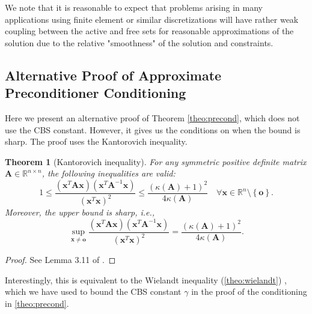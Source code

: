 \documentclass[11pt]{article}
\theoremstyle{plain}
\newtheorem{theorem}{Theorem}[section]
\theoremstyle{definition}
\newcommand{\Vo}{\bm{o}}
\newcommand{\Vx}{\bm{x}}
\newcommand{\MA}{\bm{A}}
\begin{document}
We note that it is reasonable to expect that problems arising in many applications using finite element or similar discretizations will have rather weak coupling between the active and free sets for reasonable approximations of the solution due to the relative "smoothness" of the solution and constraints.

\subsection{Alternative Proof of Approximate Preconditioner Conditioning}
Here we present an alternative proof of Theorem \ref{theo:precond}, which does not use the CBS constant. However, it gives us the conditions on when the bound is sharp. The proof uses the Kantorovich inequality.

\begin{theorem}[Kantorovich inequality]
  \label{theo:kant}
  For any symmetric positive definite matrix $\MA \in \mathbb{R}^{n \times n}$, the following inequalities are valid:
\begin{equation*}
  1 \leq \frac{\left(\Vx^{T} \MA \Vx \right) \left(\Vx^{T} \MA^{-1} \Vx\right)}{\left(\Vx^{T} \Vx\right)^{2}} \leq \frac{\left( \kappa\left( \MA \right) +1  \right)^{2}}{4\kappa(\MA)} \quad \forall \Vx \in \mathbb{R}^{n}\setminus \left\{\Vo \right\}.
\end{equation*}
Moreover, the upper bound is sharp, i.e.,
\begin{equation*}
  \sup_{\Vx \neq \Vo} \frac{\left(\Vx^{T} \MA \Vx \right) \left(\Vx^{T} \MA^{-1} \Vx\right)}{\left(\Vx^{T} \Vx\right)^{2}} = \frac{\left( \kappa\left( \MA \right) +1  \right)^{2}}{4\kappa(\MA)}.
\end{equation*}
\end{theorem}
\begin{proof}
  See Lemma 3.11 of \cite{Axelsson96}.
\end{proof}
Interestingly, this is equivalent to the Wielandt inequality (\cref{theo:wielandt}) \cite{Zhang2001}, which we have used to bound the CBS constant $\gamma$ in the proof of the conditioning in \cref{theo:precond}.
\end{document}
